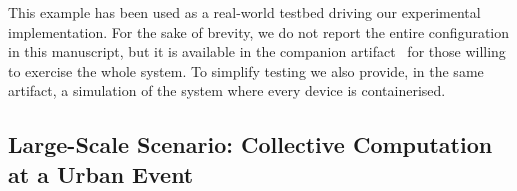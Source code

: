 \documentclass[conference]{IEEEtran}
\newcommand{\meta}[1]{{\color{blue}#1}}
\begin{document}
This example has been used as a real-world testbed driving our experimental implementation.
%
For the sake of brevity,
we do not report the entire configuration in this manuscript, but it is available in the companion artifact~\cite{https://doi.org/10.5281/zenodo.7933160}
for those willing to exercise the whole system.
%
To simplify testing we also provide,
in the same artifact,
a simulation of the system where every device is containerised.

\subsection{Large-Scale Scenario: Collective Computation at a Urban Event}
\end{document}
